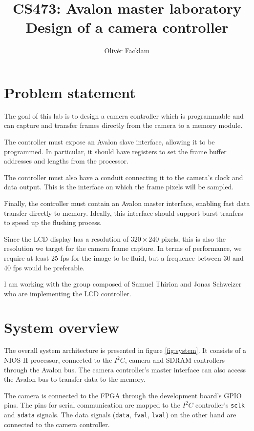 \documentclass[12pt,a4paper]{article}
\author{Olivér Facklam}
\title{CS473: Avalon master laboratory\\Design of a camera controller}
\begin{document}
\maketitle
\tableofcontents

\section{Problem statement}

The goal of this lab is to design a camera controller which is programmable and can capture and transfer frames directly from the camera to a memory module.

The controller must expose an Avalon slave interface, allowing it to be programmed. In particular, it should have registers to set the frame buffer addresses and lengths from the processor.

The controller must also have a conduit connecting it to the camera's clock and data output. This is the interface on which the frame pixels will be sampled.

Finally, the controller must contain an Avalon master interface, enabling fast data transfer directly to memory. Ideally, this interface should support burst tranfers to speed up the flushing process.

Since the LCD display has a resolution of $320\times 240$ pixels, this is also the resolution we target for the camera frame capture. In terms of performance, we require at least 25 fps for the image to be fluid, but a frequence between 30 and 40 fps would be preferable.

\bigskip
I am working with the group composed of Samuel Thirion and Jonas Schweizer who are implementing the LCD controller.

\section{System overview}

The overall system architecture is presented in figure \ref{fig:system}. It consists of a NIOS-II processor, connected to the $I^2C$, camera and SDRAM controllers through the Avalon bus. The camera controller's master interface can also access the Avalon bus to transfer data to the memory.

The camera is connected to the FPGA through the development board's GPIO pins. The pins for serial communication are mapped to the $I^2C$ controller's \texttt{sclk} and \texttt{sdata} signals. The data signals (\texttt{data}, \texttt{fval}, \texttt{lval}) on the other hand are connected to the camera controller.
\end{document}
